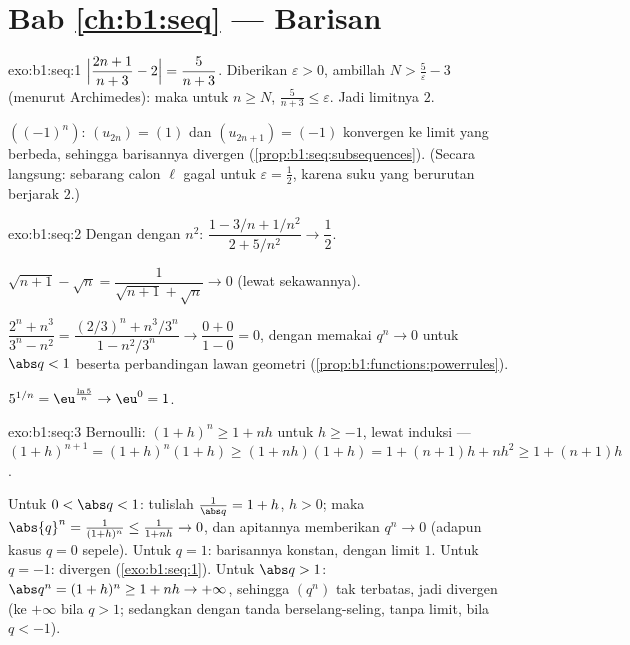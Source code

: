 \section*{Bab \ref{ch:b1:seq} --- Barisan}

\begin{solution}{exo:b1:seq:1}
$\Bigl|\dfrac{2n+1}{n+3} - 2\Bigr| = \dfrac{5}{n+3}$. Diberikan
$\varepsilon > 0$, ambillah $N > \frac 5\varepsilon - 3$ (menurut Archimedes):
maka untuk $n \geq N$, $\frac{5}{n+3} \leq \varepsilon$. Jadi limitnya
$2$.

$((-1)^n)$:  $(u_{2n}) = (1)$ dan $(u_{2n+1}) =
(-1)$ konvergen ke limit yang berbeda, sehingga barisannya divergen
(\cref{prop:b1:seq:subsequences}). (Secara langsung: sebarang calon $\ell$
gagal untuk $\varepsilon = \frac12$, karena suku yang berurutan berjarak
$2$.)
\end{solution}

\begin{solution}{exo:b1:seq:2}
Dengan  dengan $n^2$: $\dfrac{1 - 3/n + 1/n^2}{2 + 5/n^2} \to
\dfrac12$.

$\sqrt{n+1} - \sqrt n = \dfrac{1}{\sqrt{n+1} + \sqrt n} \to 0$
(lewat sekawannya).

$\dfrac{2^n + n^3}{3^n - n^2} = \dfrac{(2/3)^n + n^3/3^n}{1 -
n^2/3^n} \to \dfrac{0 + 0}{1 - 0} = 0$, dengan memakai $q^n \to 0$ untuk $\abs q
< 1$ beserta perbandingan  lawan geometri
(\cref{prop:b1:functions:powerrules}).

$5^{1/n} = \eu^{\frac{\ln 5}{n}} \to \eu^0 = 1$.
\end{solution}

\begin{solution}{exo:b1:seq:3}
Bernoulli: $(1+h)^n \geq 1 + nh$ untuk $h \geq -1$, lewat induksi ---
$(1+h)^{n+1} = (1+h)^n(1+h) \geq (1+nh)(1+h) = 1 + (n+1)h + nh^2
\geq 1 + (n+1)h$.

Untuk $0 < \abs q < 1$: tulislah $\frac{1}{\abs q} = 1 + h$, $h > 0$; maka
$\abs{q}^n = \frac{1}{(1+h)^n} \leq \frac{1}{1 + nh} \to 0$, dan
apitannya memberikan $q^n \to 0$ (adapun kasus $q = 0$ sepele). Untuk $q = 1$:
barisannya konstan, dengan limit $1$. Untuk $q = -1$: divergen
(\cref{exo:b1:seq:1}). Untuk $\abs q > 1$: $\abs q^n = (1 + h)^n \geq
1 + nh \to +\infty$, sehingga $(q^n)$ tak terbatas, jadi divergen (ke
$+\infty$ bila $q > 1$; sedangkan dengan tanda berselang-seling, tanpa limit, bila $q <
-1$).
\end{solution}


